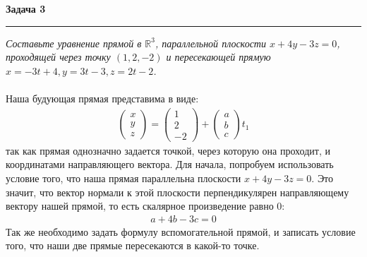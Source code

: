 \documentclass[a4paper,11pt]{article}
\begin{document}




\textbf{\large Задача 3}
\medskip\hrule\medskip
\textit{Составьте уравнение прямой в $ \mathbb{R}^3 $, параллельной плоскости $ x + 4y - 3z = 0 $, проходящей через точку $ (1, 2, -2) $ и пересекающей прямую $ x = -3t + 4, y = 3t - 3, z = 2t - 2 $.} \\ \\
Наша будующая прямая представима в виде:
\begin{gather*}
\begin{pmatrix}
x \\
y \\
z 
\end{pmatrix}
 = 
\begin{pmatrix}
1 \\
2 \\
-2 
\end{pmatrix}
+ 
\begin{pmatrix}
a \\
b \\
c 
\end{pmatrix}
t_1
\end{gather*}
так как прямая однозначно задается точкой, через которую она проходит, и координатами направляющего вектора. Для начала, попробуем использовать условие того, что наша прямая параллельна плоскости $ x + 4y - 3z = 0 $. Это значит, что вектор нормали к этой плоскости перпендикулярен направляющему вектору нашей прямой, то есть скалярное произведение равно 0:
\begin{gather*}
a + 4b - 3c = 0
\end{gather*}
Так же необходимо задать формулу вспомогательной прямой, и записать условие того, что наши две прямые пересекаются в какой-то точке. 
\end{document}
